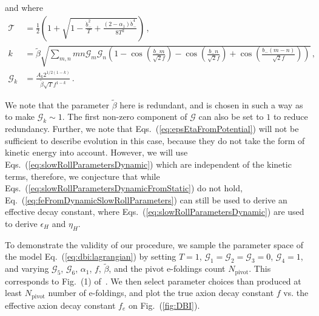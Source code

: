 \documentclass[11pt]{article}
\begin{document}
and where
\begin{align} %
  \mathcal{T} &= \frac{1}{2} \left(
      1
    + \sqrt{1 - \frac{{\dot b}_-^2}{T} + \frac{\left(2 - \alpha_1\right){\dot b}_-^4}{8 T^2}}
  \right)\,,\\
  \label{eq:dbi:beta}
  k &= \tilde\beta \sqrt{\sum_{m, n} m n \mathcal{G}_m \mathcal{G}_n \left(
      1
    - \cos\left(\frac{b_- m}{\sqrt{2} f}\right)
    - \cos\left(\frac{b_- n}{\sqrt{2} f}\right)
    + \cos\left(\frac{b_- \left(m - n\right)}{\sqrt{2} f}\right)
  \right)}\,,\\
  \mathcal{G}_k &= \frac{A_k 2^{1 / 2 \left(1 - k\right)}}{\tilde\beta \sqrt{T} f^{1 - k}}\,.
\end{align}

We note that the parameter $\tilde\beta$ here is redundant, and is chosen in such a way as to make $\mathcal{G}_k \sim 1$.
The first non-zero component of $\mathcal{G}$ can also be set to $1$ to reduce redundancy.
Further, we note that Eqs.~(\ref{eq:epsEtaFromPotential}) will not be sufficient to describe evolution in this case, because they do not take the form of kinetic energy into account.
However, we will use Eqs.~(\ref{eq:slowRollParametersDynamic}) which are independent of the kinetic terms, therefore, we conjecture that while Eqs.~(\ref{eq:slowRollParametersDynamicFromStatic}) do not hold, Eq.~(\ref{eq:feFromDynamicSlowRollParameters}) can still be used to derive an effective decay constant, where Eqs.~(\ref{eq:slowRollParametersDynamic}) are used to derive $\epsilon_H$ and $\eta_H$.

To demonstrate the validity of our procedure, we sample the parameter space of the model Eq.~(\ref{eq:dbi:lagrangian}) by setting $T = 1$, $\mathcal{G}_1 = \mathcal{G}_2 = \mathcal{G}_3 = 0$, $\mathcal{G}_4 = 1$, and varying $\mathcal{G}_5$, $\mathcal{G}_6$, $\alpha_1$, $f$, $\tilde\beta$, and the pivot e-foldings count $N_\text{pivot}$.
This corresponds to Fig.~(1) of~\cite{Nath:2018xxe}.
We then select parameter choices than produced at least $N_\text{pivot}$ number of e-foldings, and plot the true axion decay constant $f$ vs. the effective axion decay constant $f_e$ on Fig.~(\ref{fig:DBI}).
\end{document}
